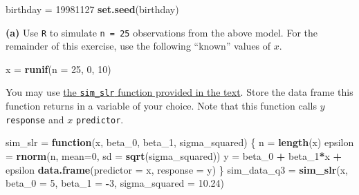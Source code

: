 \documentclass[]{article}
\newenvironment{Shaded}{\begin{snugshade}}{\end{snugshade}}
\newcommand{\KeywordTok}[1]{\textcolor[rgb]{0.13,0.29,0.53}{\textbf{#1}}}
\newcommand{\DataTypeTok}[1]{\textcolor[rgb]{0.13,0.29,0.53}{#1}}
\newcommand{\DecValTok}[1]{\textcolor[rgb]{0.00,0.00,0.81}{#1}}
\newcommand{\FloatTok}[1]{\textcolor[rgb]{0.00,0.00,0.81}{#1}}
\newcommand{\StringTok}[1]{\textcolor[rgb]{0.31,0.60,0.02}{#1}}
\newcommand{\ControlFlowTok}[1]{\textcolor[rgb]{0.13,0.29,0.53}{\textbf{#1}}}
\newcommand{\OperatorTok}[1]{\textcolor[rgb]{0.81,0.36,0.00}{\textbf{#1}}}
\newcommand{\NormalTok}[1]{#1}
\begin{document}
\begin{Shaded}
\begin{Highlighting}[]
\NormalTok{birthday =}\StringTok{ }\DecValTok{19981127}
\KeywordTok{set.seed}\NormalTok{(birthday)}
\end{Highlighting}
\end{Shaded}

\textbf{(a)} Use \texttt{R} to simulate \texttt{n\ =\ 25} observations
from the above model. For the remainder of this exercise, use the
following ``known'' values of \(x\).

\begin{Shaded}
\begin{Highlighting}[]
\NormalTok{x =}\StringTok{ }\KeywordTok{runif}\NormalTok{(}\DataTypeTok{n =} \DecValTok{25}\NormalTok{, }\DecValTok{0}\NormalTok{, }\DecValTok{10}\NormalTok{)}
\end{Highlighting}
\end{Shaded}

You may use
\href{http://daviddalpiaz.github.io/appliedstats/simple-linear-regression.html\#simulating-slr}{the
\texttt{sim\_slr} function provided in the text}. Store the data frame
this function returns in a variable of your choice. Note that this
function calls \(y\) \texttt{response} and \(x\) \texttt{predictor}.

\begin{Shaded}
\begin{Highlighting}[]
\NormalTok{sim_slr =}\StringTok{ }\ControlFlowTok{function}\NormalTok{(x, beta_}\DecValTok{0}\NormalTok{, beta_}\DecValTok{1}\NormalTok{, sigma_squared) \{}
\NormalTok{  n =}\StringTok{ }\KeywordTok{length}\NormalTok{(x)}
\NormalTok{  epsilon =}\StringTok{ }\KeywordTok{rnorm}\NormalTok{(n, }\DataTypeTok{mean=}\DecValTok{0}\NormalTok{, }\DataTypeTok{sd =} \KeywordTok{sqrt}\NormalTok{(sigma_squared))}
\NormalTok{  y =}\StringTok{ }\NormalTok{beta_}\DecValTok{0} \OperatorTok{+}\StringTok{ }\NormalTok{beta_}\DecValTok{1}\OperatorTok{*}\NormalTok{x }\OperatorTok{+}\StringTok{ }\NormalTok{epsilon}
  \KeywordTok{data.frame}\NormalTok{(}\DataTypeTok{predictor =}\NormalTok{ x, }\DataTypeTok{response =}\NormalTok{ y)}
\NormalTok{\}}
\NormalTok{sim_data_q3 =}\StringTok{ }\KeywordTok{sim_slr}\NormalTok{(x, }\DataTypeTok{beta_0 =} \DecValTok{5}\NormalTok{, }\DataTypeTok{beta_1 =} \OperatorTok{-}\DecValTok{3}\NormalTok{, }\DataTypeTok{sigma_squared =} \FloatTok{10.24}\NormalTok{)}
\end{Highlighting}
\end{Shaded}
\end{document}

